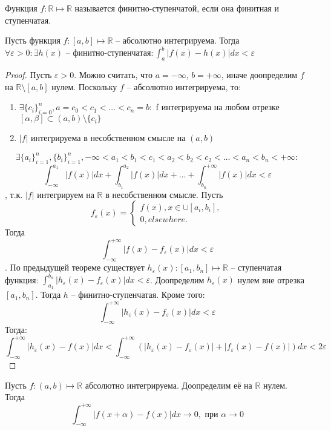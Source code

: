 \documentclass[document.tex]{subfiles}
\begin{document}
\begin{definition}
Функция $f : \mathbb{R} \mapsto \mathbb{R}$ называется финитно-ступенчатой, если она финитная и ступенчатая.
\end{definition}

\begin{theorem}
Пусть функция $f : [a, b] \mapsto \mathbb{R}$ -- абсолютно интегрируема. Тогда $\forall \varepsilon > 0: \exists h(x)\text{ -- финитно-ступенчатая} : \int_a^b|f(x)-h(x)|dx < \varepsilon$
\end{theorem}
\begin{proof}
Пусть $\varepsilon > 0$.
Можно считать, что $a = -\infty$, $b = +\infty$, иначе доопределим $f$ на $\mathbb{R} \setminus [a, b]$ нулем.
Поскольку $f$ -- абсолютно интегрируема, то:

\begin{enumerate}
\item $\exists \{c_i\}_{i=0}^n, a = c_0 < c_1 < \ldots < c_n = b:$ f интегрируема на любом отрезке $[\alpha, \beta] \subset (a, b) \setminus \{c_i\}$
\item $|f|$ интегрируема в несобственном смысле на $(a, b)$
\end{enumerate}
$$\exists \{a_i\}_{i=1}^n, \{b_i\}_{i=1}^n, -\infty < a_1 < b_1 < c_1 < a_2 < b_2 < c_2 < \ldots < a_n < b_n < +\infty:$$
$$\int_{-\infty}^{a_1}|f(x)|dx + \int_{b_1}^{a_2}|f(x)|dx + \ldots + \int_{b_n}^{+\infty}|f(x)|dx < \varepsilon$$, т.к. $|f|$ интегрируем на $\mathbb{R}$ в несобственном смысле. Пусть
$$f_{\varepsilon}(x) = \begin{cases}
f(x), x \in \cup [a_i, b_i], \\
0, elsewhere.
\end{cases}$$
Тогда $$\int_{-\infty}^{+\infty}|f(x) - f_{\varepsilon}(x)|dx < \varepsilon$$.
По предыдущей теореме существует $h_{\varepsilon}(x):[a_1, b_n] \mapsto \mathbb{R}$ -- ступенчатая функция: $\int_{a_1}^{b_n}|h_{\varepsilon}(x) - f_{\varepsilon}(x)|dx < \varepsilon$. Доопределим $h_{\varepsilon}(x)$ нулем вне отрезка $[a_1, b_n]$. Тогда $h$ -- финитно-ступенчатая. Кроме того:
$$\int_{-\infty}^{+\infty}|h_{\varepsilon}(x) - f_{\varepsilon}(x)|dx < \varepsilon$$
Тогда:
$$\int_{-\infty}^{+\infty}|h_{\varepsilon}(x) - f(x)|dx < \int_{-\infty}^{+\infty}(|h_{\varepsilon}(x) - f_{\varepsilon}(x)| + |f_{\varepsilon}(x) - f(x)|)dx < 2\varepsilon$$
\end{proof}
\begin{theorem}
Пусть $f: (a, b) \mapsto \mathbb{R}$ абсолютно интегрируема. Доопределим её на $\mathbb{R}$ нулем. Тогда $$\int_{-\infty}^{+\infty} |f(x + \alpha) - f(x)|dx \rightarrow 0, \text{ при } \alpha \rightarrow 0$$
\end{theorem}
\end{document}

